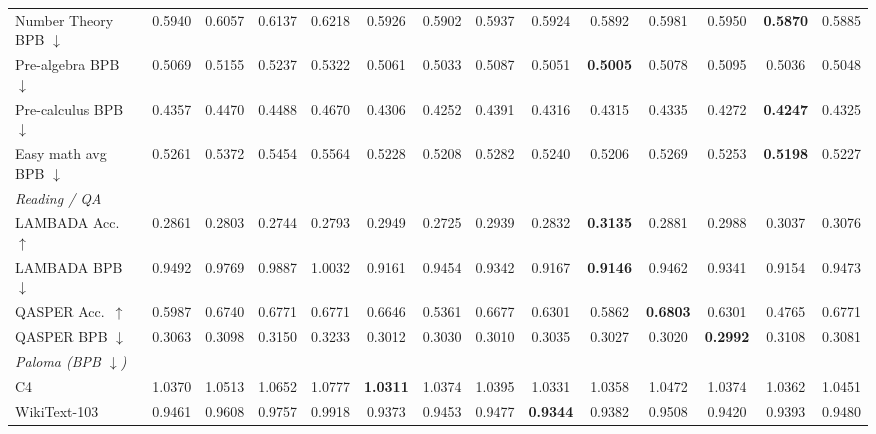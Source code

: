 \documentclass[11pt]{article}
\begin{document}
\begin{table}[t]
{\begin{tabular}{lccccccccccccc}
\quad Number Theory BPB $\downarrow$ & 0.5940 & 0.6057 & 0.6137 & 0.6218 & 0.5926 & 0.5902 & 0.5937 & 0.5924 & 0.5892 & 0.5981 & 0.5950 & \textbf{0.5870} & 0.5885 \\
\quad Pre-algebra BPB $\downarrow$ & 0.5069 & 0.5155 & 0.5237 & 0.5322 & 0.5061 & 0.5033 & 0.5087 & 0.5051 & \textbf{0.5005} & 0.5078 & 0.5095 & 0.5036 & 0.5048 \\
\quad Pre-calculus BPB $\downarrow$ & 0.4357 & 0.4470 & 0.4488 & 0.4670 & 0.4306 & 0.4252 & 0.4391 & 0.4316 & 0.4315 & 0.4335 & 0.4272 & \textbf{0.4247} & 0.4325 \\
\quad Easy math avg BPB $\downarrow$ & 0.5261 & 0.5372 & 0.5454 & 0.5564 & 0.5228 & 0.5208 & 0.5282 & 0.5240 & 0.5206 & 0.5269 & 0.5253 & \textbf{0.5198} & 0.5227 \\
\midrule
\multicolumn{14}{l}{\textit{Reading / QA}} \\
\quad LAMBADA Acc.\ $\uparrow$ & 0.2861 & 0.2803 & 0.2744 & 0.2793 & 0.2949 & 0.2725 & 0.2939 & 0.2832 & \textbf{0.3135} & 0.2881 & 0.2988 & 0.3037 & 0.3076 \\
\quad LAMBADA BPB $\downarrow$ & 0.9492 & 0.9769 & 0.9887 & 1.0032 & 0.9161 & 0.9454 & 0.9342 & 0.9167 & \textbf{0.9146} & 0.9462 & 0.9341 & 0.9154 & 0.9473 \\
\quad QASPER Acc.\ $\uparrow$ & 0.5987 & 0.6740 & 0.6771 & 0.6771 & 0.6646 & 0.5361 & 0.6677 & 0.6301 & 0.5862 & \textbf{0.6803} & 0.6301 & 0.4765 & 0.6771 \\
\quad QASPER BPB $\downarrow$ & 0.3063 & 0.3098 & 0.3150 & 0.3233 & 0.3012 & 0.3030 & 0.3010 & 0.3035 & 0.3027 & 0.3020 & \textbf{0.2992} & 0.3108 & 0.3081 \\
\midrule
\multicolumn{14}{l}{\textit{Paloma (BPB $\downarrow$)}} \\
\quad C4 & 1.0370 & 1.0513 & 1.0652 & 1.0777 & \textbf{1.0311} & 1.0374 & 1.0395 & 1.0331 & 1.0358 & 1.0472 & 1.0374 & 1.0362 & 1.0451 \\
\quad WikiText-103 & 0.9461 & 0.9608 & 0.9757 & 0.9918 & 0.9373 & 0.9453 & 0.9477 & \textbf{0.9344} & 0.9382 & 0.9508 & 0.9420 & 0.9393 & 0.9480 \\
\bottomrule
\end{tabular}%
}
\end{table}
\end{document}
